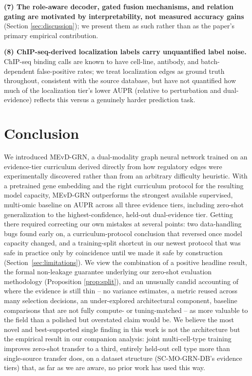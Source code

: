 \documentclass{article}
\theoremstyle{plain}
\theoremstyle{definition}
\begin{document}
\textbf{(7) The role-aware decoder, gated fusion mechanisms, and relation
gating are motivated by interpretability, not measured accuracy gains}
(Section \ref{sec:discussion}); we present them as such rather than as the
paper's primary empirical contribution.

\textbf{(8) ChIP-seq-derived localization labels carry unquantified label
noise.} ChIP-seq binding calls are known to have cell-line, antibody, and
batch-dependent false-positive rates; we treat localization edges as ground
truth throughout, consistent with the source database, but have not
quantified how much of the localization tier's lower AUPR (relative to
perturbation and dual-evidence) reflects this versus a genuinely harder
prediction task.

\section{Conclusion}
We introduced MEvD-GRN, a dual-modality graph neural network trained on an
evidence-tier curriculum derived directly from how regulatory edges were
experimentally discovered rather than from an arbitrary difficulty
heuristic. With a pretrained gene embedding and the right curriculum
protocol for the resulting model capacity, MEvD-GRN outperforms the
strongest available supervised, multi-omic baseline on AUPR across all
three evidence tiers, including zero-shot generalization to the
highest-confidence, held-out dual-evidence tier. Getting there required
correcting our own mistakes at several points: two data-handling bugs found
early on, a curriculum-protocol conclusion that reversed once model capacity
changed, and a training-split shortcut in our newest protocol that was safe
in practice only by coincidence until we made it safe by construction
(Section~\ref{sec:limitations}). We view the combination of a positive
headline result, the formal non-leakage guarantee underlying our zero-shot
evaluation methodology (Proposition \ref{prop:split}), and an unusually
candid accounting of where the evidence is still thin -- no variance
estimates, a metric reused across many selection decisions, an
under-explored architectural component, baseline comparisons that are not
fully compute- or tuning-matched -- as more valuable to the field than a
polished but overstated claim would be. We believe the most novel and
best-supported single finding in this work is not the architecture but the
empirical result in our companion analysis: joint multi-cell-type training
improves zero-shot transfer to a third, entirely held-out cell type more
than single-source transfer does, on a dataset structure (SC-MO-GRN-DB's
evidence tiers) that, as far as we are aware, no prior work has used this
way.
\end{document}
